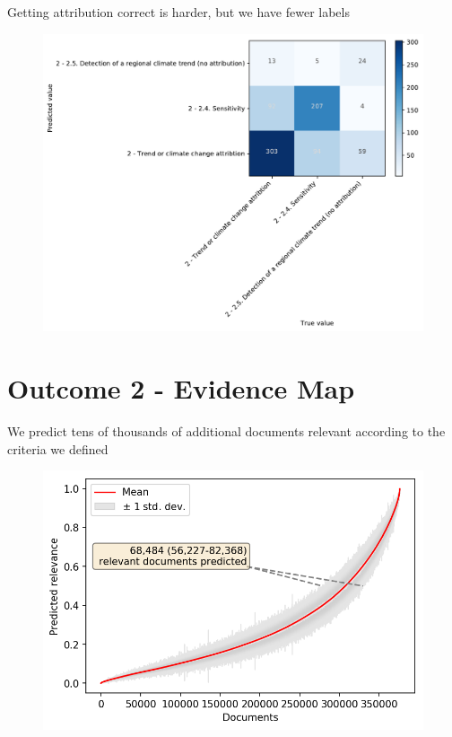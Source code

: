 \documentclass[9pt]{beamer}
\begin{document}
\begin{frame}{Getting attribution correct is harder, but we have fewer labels}
	\begin{figure}
	
	\includegraphics[width=0.8\linewidth]{../plots/prediction_models/confusion_attribution.pdf}
	\end{figure}
\end{frame}


\section{Outcome 2 - Evidence Map}
\begin{frame}
\tableofcontents[currentsection]
\end{frame}

\begin{frame}{We predict tens of thousands of additional documents relevant according to the criteria we defined}
	\begin{figure}
		\includegraphics[width=\linewidth]{../plots/prediction_models/predictions_unseen.png}
	\end{figure}
\end{frame}
\end{document}
